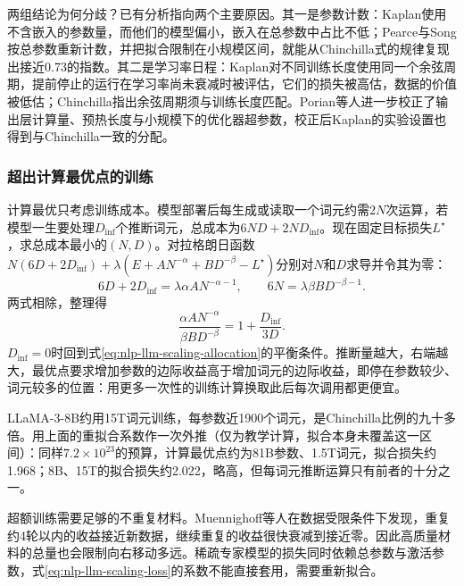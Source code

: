 两组结论为何分歧？已有分析指向两个主要原因。其一是参数计数：Kaplan使用不含嵌入的参数量，而他们的模型偏小，嵌入在总参数中占比不低；Pearce与Song按总参数重新计数，并把拟合限制在小规模区间，就能从Chinchilla式的规律复现出接近0.73的指数。其二是学习率日程：Kaplan对不同训练长度使用同一个余弦周期，提前停止的运行在学习率尚未衰减时被评估，它们的损失被高估，数据的价值被低估；Chinchilla指出余弦周期须与训练长度匹配。Porian等人进一步校正了输出层计算量、预热长度与小规模下的优化器超参数，校正后Kaplan的实验设置也得到与Chinchilla一致的分配。

\subsubsection{超出计算最优点的训练}
\label{sec:nlp-llm-beyond-compute-optimal}

计算最优只考虑训练成本。模型部署后每生成或读取一个词元约需$2N$次运算，若模型一生要处理$D_{\mathrm{inf}}$个推断词元，总成本为$6ND+2ND_{\mathrm{inf}}$。现在固定目标损失$L^\star$，求总成本最小的$(N,D)$。对拉格朗日函数$N(6D+2D_{\mathrm{inf}})+\lambda(E+AN^{-\alpha}+BD^{-\beta}-L^\star)$分别对$N$和$D$求导并令其为零：
\begin{equation*}
 6D+2D_{\mathrm{inf}}=\lambda\alpha AN^{-\alpha-1},\qquad
 6N=\lambda\beta BD^{-\beta-1}.
\end{equation*}
两式相除，整理得
\begin{equation}
 \frac{\alpha AN^{-\alpha}}{\beta BD^{-\beta}}=1+\frac{D_{\mathrm{inf}}}{3D}.
 \label{eq:nlp-llm-inference-aware}
\end{equation}
$D_{\mathrm{inf}}=0$时回到式\eqref{eq:nlp-llm-scaling-allocation}的平衡条件。推断量越大，右端越大，最优点要求增加参数的边际收益高于增加词元的边际收益，即停在参数较少、词元较多的位置：用更多一次性的训练计算换取此后每次调用都更便宜。

LLaMA-3-8B约用15T词元训练，每参数近1900个词元，是Chinchilla比例的九十多倍。用上面的重拟合系数作一次外推（仅为教学计算，拟合本身未覆盖这一区间）：同样$7.2\times10^{23}$的预算，计算最优点约为81B参数、1.5T词元，拟合损失约1.968；8B、15T的拟合损失约2.022，略高，但每词元推断运算只有前者的十分之一。

超额训练需要足够的不重复材料。Muennighoff等人在数据受限条件下发现，重复约4轮以内的收益接近新数据，继续重复的收益很快衰减到接近零。因此高质量材料的总量也会限制向右移动多远。稀疏专家模型的损失同时依赖总参数与激活参数，式\eqref{eq:nlp-llm-scaling-loss}的系数不能直接套用，需要重新拟合。

